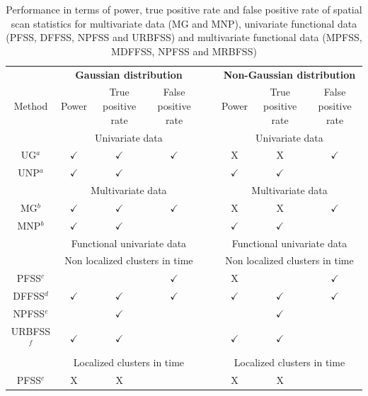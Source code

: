 \begin{table}[htbp]
\centering
\caption{Performance in terms of power, true positive rate and false positive rate of spatial scan statistics for multivariate data (MG and MNP), univariate functional data (PFSS, DFFSS, NPFSS and URBFSS) and multivariate functional data (MPFSS, MDFFSS, NPFSS and MRBFSS)}
\begin{scriptsize}
\begin{tabular}{cccccccc}
\toprule
& \multicolumn{3}{c}{\textbf{Gaussian distribution}} & \ & \multicolumn{3}{c}{\textbf{Non-Gaussian distribution}} \\
Method & Power & True positive rate & False positive rate & &  Power & True positive rate & False positive rate \\
\midrule
\midrule
& \multicolumn{3}{c}{Univariate data} & & \multicolumn{3}{c}{Univariate data} \\
\midrule
UG$^a$ & $\checkmark$ & $\checkmark$ & $\checkmark$ & &  \textsf{X} & \textsf{X} & $\checkmark$ \\
UNP$^a$ & $\checkmark$ & $\checkmark$ & & &  $\checkmark$ & $\checkmark$ & 
\\
\midrule
\midrule
& \multicolumn{3}{c}{Multivariate data} & & \multicolumn{3}{c}{Multivariate data} \\
\midrule
MG$^b$ & $\checkmark$ & $\checkmark$ & $\checkmark$ & &  \textsf{X} & \textsf{X} & $\checkmark$ \\
MNP$^b$ & $\checkmark$ & $\checkmark$ & & &  $\checkmark$ & $\checkmark$ & 
\\
\midrule
\midrule
& \multicolumn{3}{c}{Functional univariate data} & & \multicolumn{3}{c}{Functional univariate data} \\
\midrule
& \multicolumn{3}{c}{Non localized clusters in time} & & \multicolumn{3}{c}{Non localized clusters in time} \\
PFSS$^c$ & & & $\checkmark$ & &  \textsf{X} & & $\checkmark$ \\ 
DFFSS$^d$ & $\checkmark$ & $\checkmark$ & $\checkmark$ & &  $\checkmark$ & $\checkmark$ & $\checkmark$ \\
NPFSS$^e$ & & $\checkmark$ & & &  & $\checkmark$ & \\
URBFSS$^f$ & $\checkmark$ & $\checkmark$ & & &  $\checkmark$ & $\checkmark$ & \\
\midrule
& \multicolumn{3}{c}{Localized clusters in time} & & \multicolumn{3}{c}{Localized clusters in time} \\
PFSS$^c$ & \textsf{X} & \textsf{X} &  & &  \textsf{X} & \textsf{X} & \\

\end{tabular}
\end{scriptsize}
\end{table}
